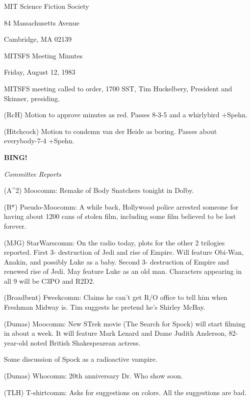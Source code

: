 \documentclass[12pt]{article}
\newcommand{\bing}{{\bf BING!} }
\newcommand{\goto}[1]{\bing \vskip 12pt \centerline{{\em{#1}}}}
\begin{document}
\begin{center}

MIT Science Fiction Society 

84 Massachusetts Avenue

Cambridge, MA 02139

\vspace{12pt}

MITSFS Meeting Minutes 

Friday, August 12, 1983

\end{center}
 
\vspace{18pt}

\setlength{\parskip}{6pt}

\noindent
MITSFS meeting called to order, 1700 SST,
Tim Huckelbery, President and Skinner, presiding.

(RcH) Motion to approve minutes as red. Passes 8-3-5 and a whirlybird +Spehn.

(Hitchcock) Motion to condemn van der Heide as boring. Passes  about everybody-7-4 +Spehn.

\goto{Committee Reports}

(A^2) Moocomm: Remake of Body Snatchers tonight in Dolby.

(B*) Pseudo-Moocomm: A while back, Hollywood police arrested someone for having about 1200 cans of stolen film, including some film believed to be lost forever.

(MJG) StarWarscomm: On the radio today, plots for the other 2 trilogies reported. First 3- destruction of Jedi and rise of Empire. Will feature Obi-Wan, Anakin, and possibly Luke as a baby. Second 3- destruction of Empire and renewed rise of Jedi. May feature Luke as an old man. Characters appearing in all 9 will be C3PO and R2D2.

(Broadbent) Fweekcomm: Claims he can't get R/O office to tell him when Freshman Midway is. Tim suggests he pretend he's Shirley McBay.

(Dumas) Moocomm: New STrek movie (The Search for Spock) will start filming in about a week. It will feature Mark Lenard and Dame Judith Anderson, 82-year-old noted British Shakespearean actress.

Some discussion of Spock as a radioactive vampire.

(Dumas) Whocomm: 20th anniversary Dr. Who show soon.

(TLH) T-shirtcomm: Asks for suggestions on colors. All the suggestions are bad.
\end{document}
